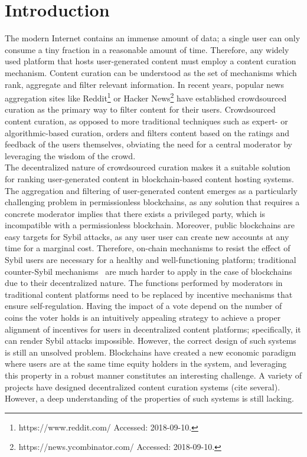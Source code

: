 \section{Introduction}
    
  The modern Internet contains an immense amount of data; a single user can only consume a tiny fraction in a reasonable amount of time. Therefore, any widely used platform that hosts user-generated content must employ a content curation mechanism. 
   Content curation can be understood as the set of mechanisms which rank, aggregate and filter relevant information. In recent years, popular news aggregation sites like Reddit\footnote{https://www.reddit.com/ Accessed: 2018-09-10.} or Hacker News\footnote{https://news.ycombinator.com/ Accessed: 2018-09-10.} have established crowdsourced curation as the primary way to filter content for their users.  
   Crowdsourced content curation, as opposed to more traditional techniques such as expert- or algorithmic-based curation, orders and filters content based on the ratings and feedback of the users themselves, obviating the need for a central moderator by leveraging the wisdom of the crowd.\\
   
  The decentralized nature of crowdsourced curation makes it a suitable solution for ranking user-generated content in blockchain-based content hosting systems. The aggregation and filtering of user-generated content emerges as a particularly challenging problem in permissionless blockchains, as any solution that requires a concrete moderator implies that there exists a privileged party, which is incompatible with a permissionless blockchain.
   Moreover, public blockchains are easy targets for Sybil attacks, as any user user can create new accounts at any time for a marginal cost.
    Therefore, on-chain mechanisms to resist the effect of Sybil users are necessary for a healthy and well-functioning platform; traditional counter-Sybil mechanisms~\cite{levine2006survey} are much harder to apply in the case of blockchains due to their decentralized nature. 
   The functions performed by moderators in traditional content platforms need to be replaced by incentive mechanisms that ensure self-regulation. Having the impact of a vote depend on the number of coins the voter holds is an intuitively appealing strategy to achieve a proper alignment of incentives for users in decentralized content platforms; specifically, it can render Sybil attacks impossible. 
   However, the correct design of such systems is still an unsolved problem. Blockchains have created a new economic paradigm where users are at the same time equity holders in the system, and leveraging this property in a robust manner constitutes an interesting challenge. 
   A variety of projects have designed decentralized content curation systems (cite several). However, a deep understanding of the properties of such systems is still lacking.\\
  
